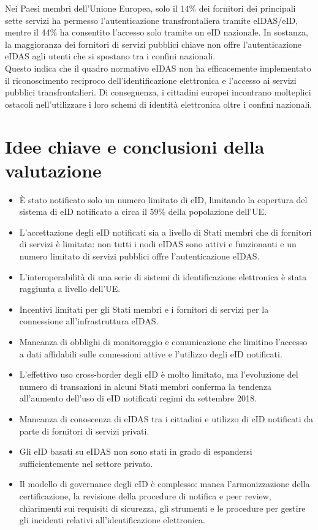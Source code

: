 Nei Paesi membri dell'Unione Europea, solo il 14\% dei fornitori dei principali sette servizi ha permesso l'autenticazione transfrontaliera tramite eIDAS/eID, mentre il 44\% ha consentito l'accesso solo tramite un eID nazionale. In sostanza, la maggioranza dei fornitori di servizi pubblici chiave non offre l'autenticazione eIDAS agli utenti che si spostano tra i confini nazionali.\\
Questo indica che il quadro normativo eIDAS non ha efficacemente implementato il riconoscimento reciproco dell'identificazione elettronica e l'accesso ai servizi pubblici transfrontalieri. Di conseguenza, i cittadini europei incontrano molteplici ostacoli nell'utilizzare i loro schemi di identità elettronica oltre i confini nazionali.
\section{Idee chiave e conclusioni della valutazione}
\begin{itemize}
    \item È stato notificato solo un numero limitato di eID, limitando la copertura del sistema di eID notificato
    a circa il 59\% della popolazione dell'UE.
    \item L'accettazione degli eID notificati sia a livello di Stati membri che di fornitori di servizi è limitata: non tutti i nodi eIDAS sono attivi e funzionanti e un numero limitato di servizi pubblici offre l'autenticazione eIDAS.
    \item L'interoperabilità di una serie di sistemi di identificazione elettronica è stata raggiunta a livello dell'UE.
    \item Incentivi limitati per gli Stati membri e i fornitori di servizi per la connessione all'infrastruttura eIDAS.
    \item Mancanza di obblighi di monitoraggio e comunicazione che limitino l'accesso a dati affidabili sulle connessioni attive e l'utilizzo degli eID notificati.
    \item L'effettivo uso cross-border degli eID è molto limitato, ma l'evoluzione del numero di
    transazioni in alcuni Stati membri conferma la tendenza all'aumento dell'uso di eID notificati
    regimi da settembre 2018.
    \item Mancanza di conoscenza di eIDAS tra i cittadini e utilizzo di eID notificati da parte di fornitori di servizi privati.
    \item Gli eID basati su eIDAS non sono stati in grado di espandersi sufficientemente nel settore privato.
    \item Il modello di governance degli eID è complesso: manca l'armonizzazione della certificazione, la revisione della
    procedure di notifica e peer review, chiarimenti sui requisiti di sicurezza, gli strumenti e le procedure per gestire gli incidenti relativi all'identificazione elettronica.
    
\end{itemize}